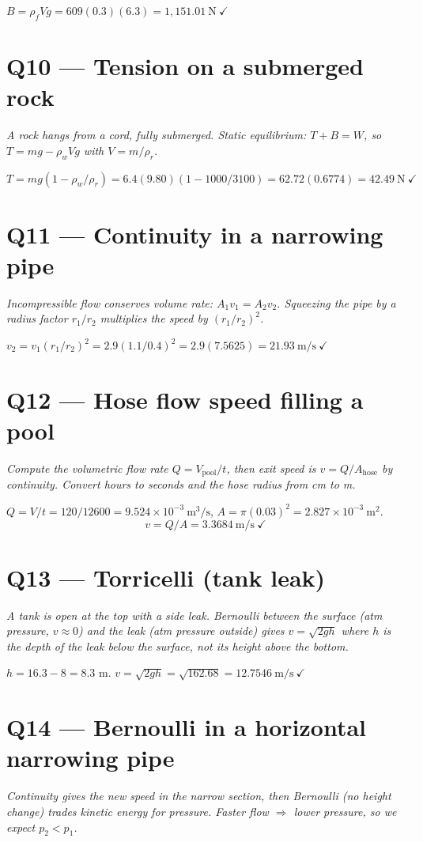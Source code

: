 \documentclass[11pt]{article}
\newcommand{\checkmk}{\ensuremath{\checkmark}}
\begin{document}
$B = \rho_f V g = 609(0.3)(6.3) = \boxed{1{,}151.01\ \text{N}}\ \checkmk$

\section*{Q10 --- Tension on a submerged rock}
\emph{A rock hangs from a cord, fully submerged. Static equilibrium: $T + B = W$, so $T = mg - \rho_w V g$ with $V = m/\rho_r$.}

$T = mg(1 - \rho_w/\rho_r) = 6.4(9.80)(1 - 1000/3100) = 62.72(0.6774) = \boxed{42.49\ \text{N}}\ \checkmk$

\section*{Q11 --- Continuity in a narrowing pipe}
\emph{Incompressible flow conserves volume rate: $A_1 v_1 = A_2 v_2$. Squeezing the pipe by a radius factor $r_1/r_2$ multiplies the speed by $(r_1/r_2)^2$.}

$v_2 = v_1(r_1/r_2)^2 = 2.9(1.1/0.4)^2 = 2.9(7.5625) = \boxed{21.93\ \text{m/s}}\ \checkmk$

\section*{Q12 --- Hose flow speed filling a pool}
\emph{Compute the volumetric flow rate $Q = V_{\text{pool}}/t$, then exit speed is $v = Q/A_{\text{hose}}$ by continuity. Convert hours to seconds and the hose radius from cm to m.}

$Q = V/t = 120/12600 = 9.524\times 10^{-3}\ \text{m}^3/\text{s}$, $A = \pi(0.03)^2 = 2.827\times 10^{-3}\ \text{m}^2$.
\[ v = Q/A = \boxed{3.3684\ \text{m/s}}\ \checkmk \]

\section*{Q13 --- Torricelli (tank leak)}
\emph{A tank is open at the top with a side leak. Bernoulli between the surface (atm pressure, $v\approx 0$) and the leak (atm pressure outside) gives $v = \sqrt{2gh}$ where $h$ is the depth of the leak \emph{below the surface}, not its height above the bottom.}

$h = 16.3 - 8 = 8.3$ m. $v = \sqrt{2gh} = \sqrt{162.68} = \boxed{12.7546\ \text{m/s}}\ \checkmk$

\section*{Q14 --- Bernoulli in a horizontal narrowing pipe}
\emph{Continuity gives the new speed in the narrow section, then Bernoulli (no height change) trades kinetic energy for pressure. Faster flow $\Rightarrow$ lower pressure, so we expect $p_2 < p_1$.}
\end{document}

